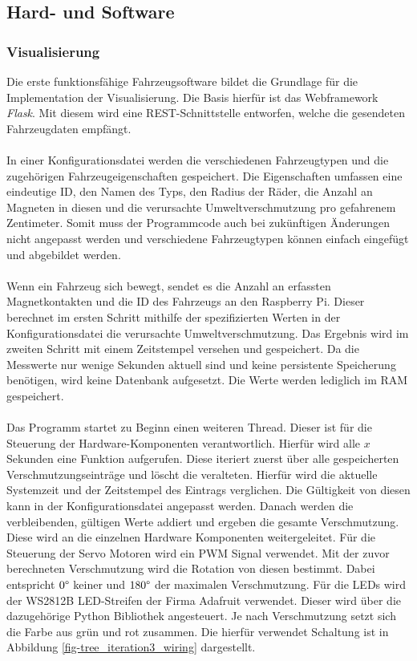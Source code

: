 \documentclass[.../Dokumentation.tex]{subfiles}
\begin{document}
    \subsection{Hard- und Software}
    \label{sec-ita3-hardware}
    \subsubsection*{Visualisierung}
    Die erste funktionsfähige Fahrzeugsoftware bildet die Grundlage für die Implementation der Visualisierung. Die Basis hierfür ist das Webframework \emph{Flask}. Mit diesem wird eine REST-Schnittstelle entworfen, welche die gesendeten Fahrzeugdaten empfängt. \\\\
    In einer Konfigurationsdatei werden die verschiedenen Fahrzeugtypen und die zugehörigen Fahrzeugeigenschaften gespeichert. Die Eigenschaften umfassen eine eindeutige ID, den Namen des Typs, den Radius der Räder, die Anzahl an Magneten in diesen und die verursachte Umweltverschmutzung pro gefahrenem Zentimeter. Somit muss der Programmcode auch bei zukünftigen Änderungen nicht angepasst werden und verschiedene Fahrzeugtypen können einfach eingefügt und abgebildet werden.\\\\
    Wenn ein Fahrzeug sich bewegt, sendet es die Anzahl an erfassten Magnetkontakten und die ID des Fahrzeugs an den Raspberry Pi. Dieser berechnet im ersten Schritt mithilfe der spezifizierten Werten in der Konfigurationsdatei die verursachte Umweltverschmutzung. Das Ergebnis wird im zweiten Schritt mit einem Zeitstempel versehen und gespeichert. Da die Messwerte nur wenige Sekunden aktuell sind und keine persistente Speicherung benötigen, wird keine Datenbank aufgesetzt. Die Werte werden lediglich im RAM gespeichert.\\\\
    Das Programm startet zu Beginn einen weiteren Thread. Dieser ist für die Steuerung der Hardware-Komponenten verantwortlich. Hierfür wird alle $x$ Sekunden eine Funktion aufgerufen. Diese iteriert zuerst über alle gespeicherten Verschmutzungseinträge und löscht die veralteten. Hierfür wird die aktuelle Systemzeit und der Zeitstempel des Eintrags verglichen. Die Gültigkeit von diesen kann in der Konfigurationsdatei angepasst werden. Danach werden die verbleibenden, gültigen Werte addiert und ergeben die gesamte Verschmutzung. Diese wird an die einzelnen Hardware Komponenten weitergeleitet. Für die Steuerung der Servo Motoren wird ein PWM Signal verwendet. Mit der zuvor berechneten Verschmutzung wird die Rotation von diesen bestimmt. Dabei entspricht $0 \degree$ keiner und $180 \degree$ der maximalen Verschmutzung. Für die LEDs wird der WS2812B LED-Streifen der Firma Adafruit verwendet. Dieser wird über die dazugehörige Python Bibliothek angesteuert. Je nach Verschmutzung setzt sich die Farbe aus grün und rot zusammen. Die hierfür verwendet Schaltung ist in Abbildung \ref{fig-tree_iteration3_wiring} dargestellt. 
\end{document}
